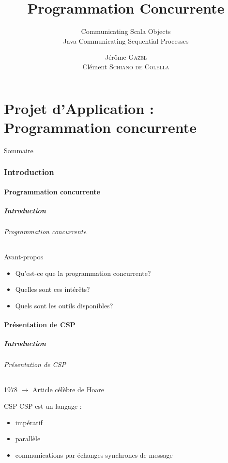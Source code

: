 \documentclass[slidetop,11pt]{beamer}
\title{Programmation Concurrente}
\subtitle{Communicating Scala Objects\\Java Communicating Sequential Processes}
\author{Jérôme \textsc{Gazel} \\ Clément \textsc{Schiano de Colella}}
\institute{\'Ecole Centrale de Nantes}
\date{\oldstylenums{vendredi 25 mars 2011}}
\begin{document}
\frame{\titlepage}
%
\part{Projet d'Application : Programmation concurrente} 
\begin{frame}{Sommaire}
  \small \tableofcontents[hideallsubsections]
\end{frame} 


\section{Introduction}
\subsection{Programmation concurrente}
\begin{frame}[label=pagesimple]
  \frametitle{Introduction}
  \framesubtitle{Programmation concurrente}
  \begin{block}{Avant-propos}
  \begin{itemize}[<+->]
    \item Qu'est-ce que la programmation concurrente?
    \item Quelles sont ces intérêts?
    \item Quels sont les outils disponibles?
  \end{itemize}
  \end{block}
  \bigskip
\end{frame}

\subsection{Présentation de CSP}
\begin{frame} 
  \frametitle{Introduction}
  \framesubtitle{Présentation de CSP}
  1978 $\rightarrow$ Article célèbre de Hoare\\ 
  \pause
  \begin{block}{CSP}
  CSP est un langage :
\begin{itemize}[<+->]
\item impératif
\item parallèle
\item communications par échanges synchrones de message
 \end{itemize}
 \end{block}
\end{frame}
\end{document}
